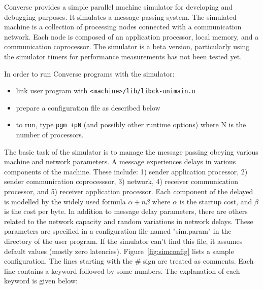 Converse provides a simple parallel machine simulator for developing
and debugging purposes. It simulates a message passing system. The
simulated machine is a collection of processing nodes connected with a
communication network. Each node is composed of an application
processor, local memory, and a communication coprocessor.  The
simulator is a beta version, particularly using the simulator timers
for performance measurements has not been tested yet.

In order to run Converse programs with the simulator:
\begin{itemize}
\item link user program with \verb+<machine>/lib/libck-unimain.o+
\item prepare a configuration file as described below
\item to run, type \verb#pgm +pN# (and possibly other runtime options) where
   N is the number of processors.
\end{itemize}

The basic task of the simulator is to manage the message passing
obeying various machine and network parameters.  A message experiences
delays in various components of the machine. These include: 1) sender
application processor, 2) sender communication coprocesssor, 3)
network, 4) receiver communication processor, and 5) receiver
application processor.  Each component of the delayed is modelled by
the widely used formula $\alpha + n\beta$ where $\alpha$ is the
startup cost, and $\beta$ is the cost per byte.  In addition to
message delay parameters, there are others related to the network
capacity and random variations in network delays. These parameters are
specified in a configuration file named "sim.param" in the directory
of the user program. If the simulator can't find this file, it assumes
default values (mostly zero latencies).  Figure~\ref{fig:simconfig}
lists a sample configuration. The lines starting with the \# sign are
treated as comments. Each line contains a keyword followed by some
numbers. The explanation of each keyword is given below:

